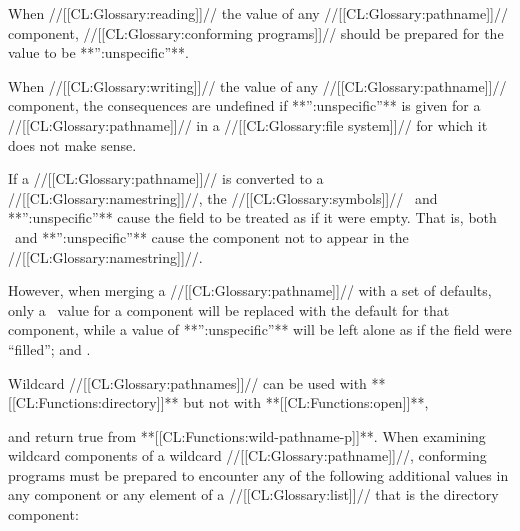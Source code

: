 
When //[[CL:Glossary:reading]]// the value of any //[[CL:Glossary:pathname]]// component, //[[CL:Glossary:conforming programs]]// should be prepared for the value to be **'':unspecific''**.

 When //[[CL:Glossary:writing]]// the value of any //[[CL:Glossary:pathname]]// component, the consequences are undefined if **'':unspecific''** is given  for a //[[CL:Glossary:pathname]]// in a //[[CL:Glossary:file system]]// for which it does not make sense.


 If a //[[CL:Glossary:pathname]]// is converted to a //[[CL:Glossary:namestring]]//,  the //[[CL:Glossary:symbols]]// \nil\ and **'':unspecific''** cause the field to be treated as if it were empty. That is, both \nil\ and **'':unspecific''**  cause the component not to appear in the //[[CL:Glossary:namestring]]//.

However, when merging a //[[CL:Glossary:pathname]]// with a set of defaults, only a \nil\ value for a component  will be replaced with the default for that component,  while a value of **'':unspecific''** will be left alone as if the field were ``filled'';  and \secref\MergingPathnames.

\endsubsubsubsubsection%

\endsubsubsubsection%

\endsubsubsection%

\endsubsubsection%

 

  Wildcard //[[CL:Glossary:pathnames]]// can be used with **[[CL:Functions:directory]]** but not with 
  **[[CL:Functions:open]]**,

  and return true from **[[CL:Functions:wild-pathname-p]]**. When examining
  wildcard components of a wildcard //[[CL:Glossary:pathname]]//, conforming programs
  must be prepared to encounter any of the following additional values
  in any component or any element of a //[[CL:Glossary:list]]// that is the directory component:
  \beginlist

